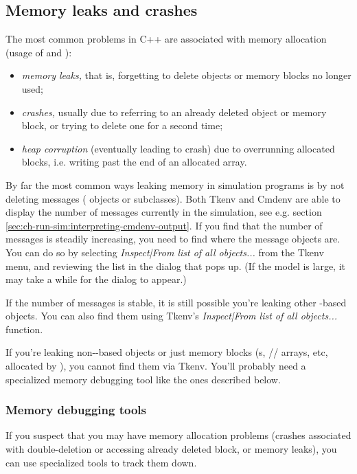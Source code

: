 \subsection{Memory leaks and crashes}

The most common problems in C++ are associated with memory allocation
(usage of  and ):

\begin{itemize}
   \item{\textit{memory leaks,} that is, forgetting to delete objects
     or memory blocks no longer used;}
   \item{\textit{crashes,} usually due to referring to an already deleted
     object or memory block, or trying to delete one for a second time;}
   \item{\textit{heap corruption} (eventually leading to crash) due to
     overrunning allocated blocks, i.e. writing past the end of an allocated
     array.}
\end{itemize}

By far the most common ways leaking memory in simulation programs
is by not deleting messages ( objects or subclasses).
Both Tkenv and Cmdenv are able to display the number of messages
currently in the simulation,
see e.g. section \ref{sec:ch-run-sim:interpreting-cmdenv-output}.
If you find that the number of messages is steadily increasing,
you need to find where the message objects are. You can do so
by selecting \textit{Inspect|From list of all objects...} from
the Tkenv menu, and reviewing the list in the dialog that pops up.
(If the model is large, it may take a while for the dialog to appear.)

If the number of messages is stable, it is still possible
you're leaking other -based objects. You can
also find them using Tkenv's \textit{Inspect|From list of all objects...}
function.

If you're leaking non--based objects or just
memory blocks (s, // arrays,
etc, allocated by ), you cannot find them via Tkenv.
You'll probably need a specialized memory debugging tool like
the ones described below.

\subsubsection{Memory debugging tools}

If you suspect that you may have memory allocation problems
(crashes associated with double-deletion or accessing already
deleted block, or memory leaks), you can use specialized tools
to track them down.

